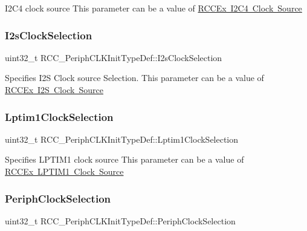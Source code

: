 I2\+C4 clock source This parameter can be a value of \mbox{\hyperlink{group___r_c_c_ex___i2_c4___clock___source}{R\+C\+C\+Ex I2\+C4 Clock Source}} \mbox{\label{struct_r_c_c___periph_c_l_k_init_type_def_a52cf8098ab8dc8d9b5e56ed6c3702b89}} 
\subsubsection{\texorpdfstring{I2sClockSelection}{I2sClockSelection}}
{\footnotesize\ttfamily uint32\+\_\+t R\+C\+C\+\_\+\+Periph\+C\+L\+K\+Init\+Type\+Def\+::\+I2s\+Clock\+Selection}

Specifies I2S Clock source Selection. This parameter can be a value of \mbox{\hyperlink{group___r_c_c_ex___i2_s___clock___source}{R\+C\+C\+Ex I2S Clock Source}} \mbox{\label{struct_r_c_c___periph_c_l_k_init_type_def_a1a290839542d3836d0cfe98142b5f219}} 
\subsubsection{\texorpdfstring{Lptim1ClockSelection}{Lptim1ClockSelection}}
{\footnotesize\ttfamily uint32\+\_\+t R\+C\+C\+\_\+\+Periph\+C\+L\+K\+Init\+Type\+Def\+::\+Lptim1\+Clock\+Selection}

Specifies L\+P\+T\+I\+M1 clock source This parameter can be a value of \mbox{\hyperlink{group___r_c_c_ex___l_p_t_i_m1___clock___source}{R\+C\+C\+Ex L\+P\+T\+I\+M1 Clock Source}} \mbox{\label{struct_r_c_c___periph_c_l_k_init_type_def_a1fe6e3d75864d85b911eef15dfc35925}} 
\subsubsection{\texorpdfstring{PeriphClockSelection}{PeriphClockSelection}}
{\footnotesize\ttfamily uint32\+\_\+t R\+C\+C\+\_\+\+Periph\+C\+L\+K\+Init\+Type\+Def\+::\+Periph\+Clock\+Selection}

